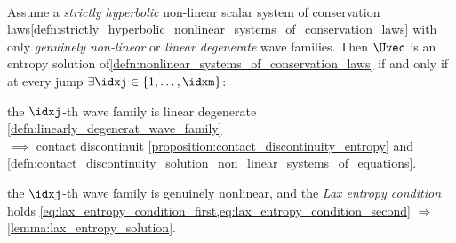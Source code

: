 \begin{lemmabox}\nospacing
    \begin{lemma}\leavevmode\\
        Assume a \textit{strictly hyperbolic} non-linear scalar system of conservation laws\cref{defn:strictly_hyperbolic_nonlinear_systems_of_conservation_laws} with only \textit{genuinely non-linear} or \textit{linear degenerate} wave families.
        Then $\Uvec$ is an entropy solution of\cref{defn:nonlinear_systems_of_conservation_laws} if and only if at every jump $\exists\idxj\in\{1,\ldots,\idxm\}$:
        \begin{itemizenosep}
            \item the $\idxj$-th wave family is linear degenerate \cref{defn:linearly_degenerat_wave_family}\\
            $\implies$ contact discontinuit \cref{proposition:contact_discontinuity_entropy} and \cref{defn:contact_discontinuity_solution_non_linear_systems_of_equations}.
            \item the $\idxj$-th wave family is genuinely nonlinear, and the \textit{Lax entropy condition} holds \cref{eq:lax_entropy_condition_first,eq:lax_entropy_condition_second} $\Rightarrow$ \cref{lemma:lax_entropy_solution}.
        \end{itemizenosep}
    \end{lemma}
\end{lemmabox}


